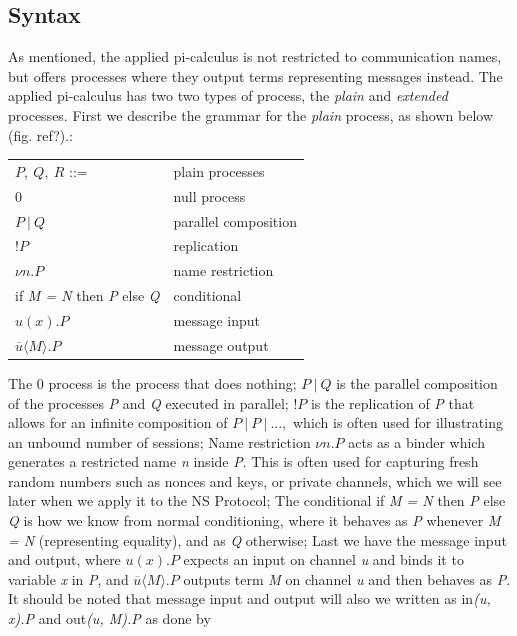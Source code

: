 \subsection{Syntax}
As mentioned, the applied pi-calculus is not restricted to communication names, but offers processes where they output terms representing messages instead. The applied pi-calculus has two two types of process, the \textit{plain} and \textit{extended} processes. First we describe the grammar for the \textit{plain} process, as shown below (fig. ref?).:  %
\begin{center}
	\begin{tabular} { l l }
 		$P,\ Q,\ R$ ::= & plain processes \\ 
 		0 & null process \\  
 		$P\ |\ Q$ & parallel composition \\
 		!$P$ & replication \\
		$\nu n.P$ & name restriction \\
		if \textit{M = N} then \textit{P} else \textit{Q} & conditional \\
		$u(x).P$ & message input \\
		$\overline{u}\langle M\rangle .P $ & message output 
	\end{tabular}
\end{center}
The 0 process is the process that does nothing; $P\ |\ Q$ is the parallel composition of the processes \textit{P} and \textit{Q} executed in parallel; !$P$ is the replication of \textit{P} that allows for an infinite composition of $P\ |\ P\ |\ ...,$ which is often used for illustrating an unbound number of sessions; Name restriction $\nu n.P$ acts as a binder which generates a restricted name \textit{n} inside \textit{P}. This is often used for capturing fresh random numbers such as nonces and keys, or private channels, which we will see later when we apply it to the NS Protocol; The conditional if \textit{M = N} then \textit{P} else \textit{Q} is how we know from normal conditioning, where it behaves as \textit{P} whenever \textit{M = N} (representing equality), and as \textit{Q} otherwise; Last we have the message input and output, where $u(x).P$ expects an input on channel \textit{u} and binds it to variable \textit{x} in \textit{P}, and $\overline{u}\langle M\rangle .P $ outputs term \textit{M} on channel \textit{u} and then behaves as \textit{P}. It should be noted that message input and output will also we written as in\textit{(u, x).P} and out\textit{(u, M).P} as done by \citeauthor{DBLP:journals/ftpl/CortierK14} \\

